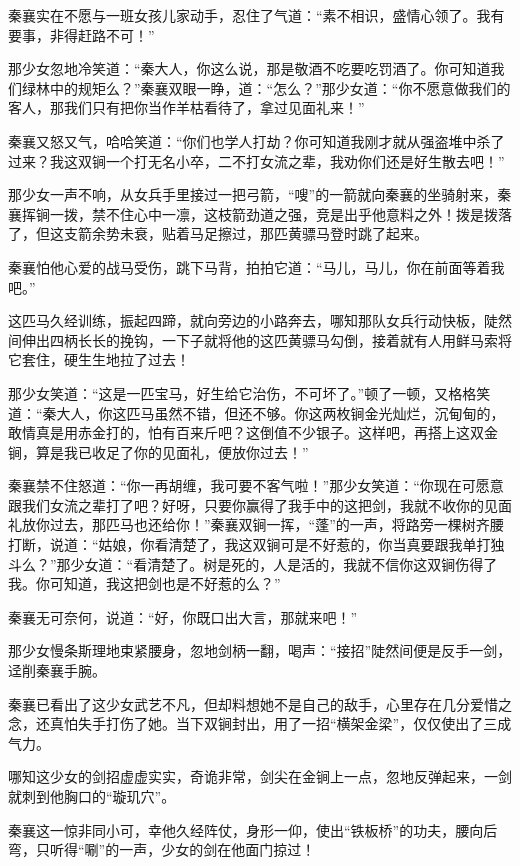 \documentclass[12pt,oneside]{book}
\begin{document}
秦襄实在不愿与一班女孩儿家动手，忍住了气道：``素不相识，盛情心领了。我有要事，非得赶路不可！''

那少女忽地冷笑道：``秦大人，你这么说，那是敬酒不吃要吃罚酒了。你可知道我们绿林中的规矩么？''秦襄双眼一睁，道：``怎么？''那少女道：``你不愿意做我们的客人，那我们只有把你当作羊枯看待了，拿过见面礼来！''

秦襄又怒又气，哈哈笑道：``你们也学人打劫？你可知道我刚才就从强盗堆中杀了过来？我这双锏一个打无名小卒，二不打女流之辈，我劝你们还是好生散去吧！''

那少女一声不响，从女兵手里接过一把弓箭，``嗖''的一箭就向秦襄的坐骑射来，秦襄挥锏一拨，禁不住心中一凛，这枝箭劲道之强，竞是出乎他意料之外！拨是拨落了，但这支箭余势未衰，贴着马足擦过，那匹黄骠马登时跳了起来。

秦襄怕他心爱的战马受伤，跳下马背，拍拍它道：``马儿，马儿，你在前面等着我吧。''

这匹马久经训练，振起四蹄，就向旁边的小路奔去，哪知那队女兵行动快板，陡然间伸出四柄长长的挽钩，一下子就将他的这匹黄骠马勾倒，接着就有人用鲜马索将它套住，硬生生地拉了过去！

那少女笑道：``这是一匹宝马，好生给它治伤，不可坏了。''顿了一顿，又格格笑道：``秦大人，你这匹马虽然不错，但还不够。你这两枚锏金光灿烂，沉甸甸的，敢情真是用赤金打的，怕有百来斤吧？这倒值不少银子。这样吧，再搭上这双金锏，算是我已收足了你的见面礼，便放你过去！''

秦襄禁不住怒道：``你一再胡缠，我可要不客气啦！''那少女笑道：``你现在可愿意跟我们女流之辈打了吧？好呀，只要你赢得了我手中的这把剑，我就不收你的见面礼放你过去，那匹马也还给你！''秦襄双锏一挥，``蓬''的一声，将路旁一棵树齐腰打断，说道：``姑娘，你看清楚了，我这双锏可是不好惹的，你当真要跟我单打独斗么？''那少女道：``看清楚了。树是死的，人是活的，我就不信你这双锏伤得了我。你可知道，我这把剑也是不好惹的么？''

秦襄无可奈何，说道：``好，你既口出大言，那就来吧！''

那少女慢条斯理地束紧腰身，忽地剑柄一翻，喝声：``接招''陡然间便是反手一剑，迳削秦襄手腕。

秦襄已看出了这少女武艺不凡，但却料想她不是自己的敌手，心里存在几分爱惜之念，还真怕失手打伤了她。当下双锏封出，用了一招``横架金梁''，仅仅使出了三成气力。

哪知这少女的剑招虚虚实实，奇诡非常，剑尖在金锏上一点，忽地反弹起来，一剑就刺到他胸口的``璇玑穴''。

秦襄这一惊非同小可，幸他久经阵仗，身形一仰，使出``铁板桥''的功夫，腰向后弯，只听得``唰''的一声，少女的剑在他面门掠过！
\end{document}
